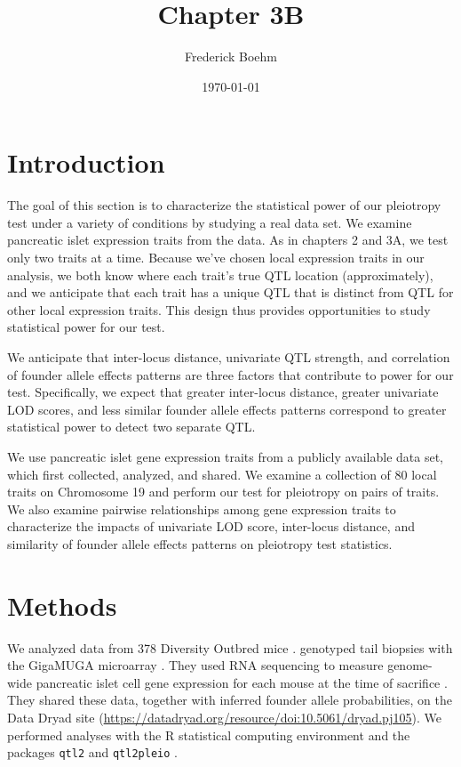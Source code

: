 \documentclass{article}
\title{Chapter 3B}
\author{Frederick Boehm}
\date{\today}
\begin{document}
\doublespacing
\maketitle
\listoftodos
\tableofcontents
\listoffigures
\listoftables



\section{Introduction}

The goal of this section is to characterize the statistical power of our pleiotropy test under a variety of conditions by studying a real data set. We examine pancreatic islet expression traits from the \citet{keller2018genetic} data. As in chapters 2 and 3A, we test only two traits at a time. Because we’ve chosen local expression traits in our analysis, we both know where each trait’s true QTL location (approximately), and we anticipate that each trait has a unique QTL that is distinct from QTL for other local expression traits. This design thus provides opportunities to study statistical power for our test.

We anticipate that inter-locus distance, univariate QTL strength, and correlation of founder allele effects patterns are three factors that contribute to power for our test. Specifically, we expect that greater inter-locus distance, greater univariate LOD scores, and less similar founder allele effects patterns correspond to greater statistical power to detect two separate QTL. 

We use pancreatic islet gene expression traits from a publicly available data set, which \citet{keller2018genetic} first collected, analyzed, and shared. We examine a collection of 80 local traits on Chromosome 19 and perform our test for pleiotropy on pairs of traits. We also examine pairwise relationships among gene expression traits to characterize the impacts of univariate LOD score, inter-locus distance, and similarity of founder allele effects patterns on pleiotropy test statistics.



\section{Methods}


We analyzed data from 378 Diversity Outbred mice \citep{keller2018genetic}. \citet{keller2018genetic} genotyped tail biopsies with the GigaMUGA microarray \citep{morgan2016mouse}. They used RNA sequencing to measure genome-wide pancreatic islet cell gene expression for each mouse at the time of sacrifice \citep{keller2018genetic}. They shared these data, together with inferred founder allele probabilities, on the Data Dryad site (\url{https://datadryad.org/resource/doi:10.5061/dryad.pj105}). We performed analyses with the R statistical computing environment \citep{r} and the packages \texttt{qtl2} \citep{qtl2} and \texttt{qtl2pleio} \citep{qtl2pleio}.
\end{document}
